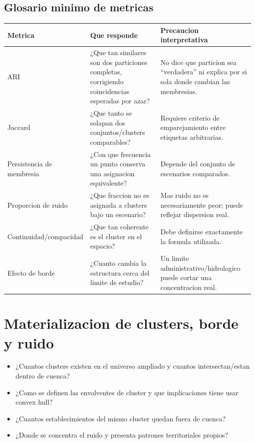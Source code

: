 \documentclass[11pt,letterpaper]{article}
\begin{document}
\subsection{Glosario minimo de metricas}
\begin{longtable}{p{}p{}p{}}
\toprule
\textbf{Metrica} & \textbf{Que responde} & \textbf{Precaucion interpretativa} \\
\midrule
ARI & ¿Que tan similares son dos particiones completas, corrigiendo coincidencias esperadas por azar? & No dice que particion sea ``verdadera'' ni explica por si sola donde cambian las membresias. \\
Jaccard & ¿Que tanto se solapan dos conjuntos/clusters comparables? & Requiere criterio de emparejamiento entre etiquetas arbitrarias. \\
Persistencia de membresia & ¿Con que frecuencia un punto conserva una asignacion equivalente? & Depende del conjunto de escenarios comparados. \\
Proporcion de ruido & ¿Que fraccion no es asignada a clusters bajo un escenario? & Mas ruido no es necesariamente peor; puede reflejar dispersion real. \\
Continuidad/compacidad & ¿Que tan coherente es el cluster en el espacio? & Debe definirse exactamente la formula utilizada. \\
Efecto de borde & ¿Cuanto cambia la estructura cerca del limite de estudio? & Un limite administrativo/hidrologico puede cortar una concentracion real. \\
\bottomrule
\end{longtable}

\section{Materializacion de clusters, borde y ruido}

\begin{preguntas}
\begin{itemize}
    \item ¿Cuantos clusters existen en el universo ampliado y cuantos intersectan/estan dentro de cuenca?
    \item ¿Como se definen las envolventes de cluster y que implicaciones tiene usar convex hull?
    \item ¿Cuantos establecimientos del mismo cluster quedan fuera de cuenca?
    \item ¿Donde se concentra el ruido y presenta patrones territoriales propios?
\end{itemize}
\end{preguntas}
\end{document}
